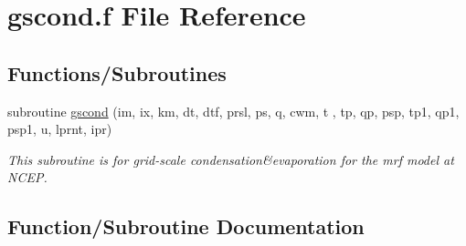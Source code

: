 \hypertarget{gscond_8f}{}\section{gscond.\+f File Reference}
\label{gscond_8f}
\subsection*{Functions/\+Subroutines}
{\bf }\par
\begin{DoxyCompactItemize}
\item 
subroutine \hyperlink{gscond_8f_a02cb3895f68b86a4b7e259c8c098ecc1}{gscond} (im, ix, km, dt, dtf, prsl, ps, q, cwm, t                                                           ,                                                               tp, qp, psp, tp1, qp1, psp1, u, lprnt, ipr)
\begin{DoxyCompactList}\small\item\em This subroutine is for grid-\/scale condensation\&evaporation for the mrf model at N\+C\+EP. \end{DoxyCompactList}\end{DoxyCompactItemize}



\subsection{Function/\+Subroutine Documentation}

